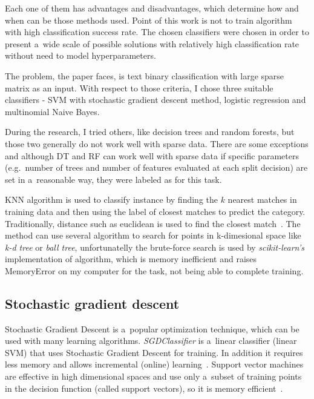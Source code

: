 Each one of them has advantages and disadvantages, which determine how and when can be those methods used.
Point of this work is not to train algorithm with high classification success rate.
The chosen classifiers were chosen in order to present a~wide scale of possible solutions with relatively high classification rate without need to  model hyperparameters.

The problem, the paper faces, is text binary classification with large sparse matrix as an input.
With respect to those criteria, I chose three suitable classifiers - SVM with stochastic gradient descent method, logistic regression and multinomial Naive Bayes.

During the research, I tried others, like decision trees and random forests, but those two generally do not work well with sparse data.
There are some exceptions and although DT and RF can work well with sparse data if specific parameters (e.g.\ number of trees and number of features evaluated at each split decision) are set in a~reasonable way, they were labeled as  for this task.

KNN algorithm is used to classify instance by finding the \( k \) nearest matches in training data and then using the label of closest matches to predict the category.
Traditionally, distance such as euclidean is used to find the closest match~\cite{web:knn-text-classification}.
The method can use several algorithm to search for points in k-dimesional space like \textit{k-d tree} or \textit{ball tree}, unfortunatelly the brute-force search is used by \textit{scikit-learn's} implementation of algorithm, which is memory inefficient and raises MemoryError on my computer for the task, not being able to complete training.

\subsection{Stochastic gradient descent}\label{subsec:stochastic-gradient-descent}

Stochastic Gradient Descent is a~popular optimization technique, which can be used with many learning algorithms.
\textit{SGDClassifier} is a~linear classifier (linear SVM) that uses Stochastic Gradient Descent for training.
In addition it requires less memory and allows incremental (online) learning~\cite{scikit-learn}.
Support vector machines are effective in high dimensional spaces and use only a~subset of training points in the decision function (called support vectors), so it is memory efficient~\cite{scikit-learn}.

